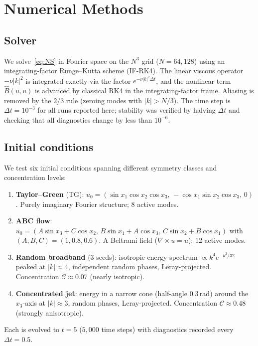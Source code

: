 \documentclass[11pt]{article}
\theoremstyle{definition}
\newcommand{\cC}{\mathcal{C}}
\begin{document}
\section{Numerical Methods}
\label{sec:method}

\subsection{Solver}

We solve~\eqref{eq:NS} in Fourier space on the
$N^3$ grid ($N=64,128$) using an integrating-factor
Runge--Kutta scheme (IF-RK4).  The linear viscous
operator $-\nu|k|^2$ is integrated exactly via the
factor $e^{-\nu|k|^2\Delta t}$, and the nonlinear term
$\hat B(u,u)$ is advanced by classical RK4 in the
integrating-factor frame.  Aliasing is removed by the
$2/3$ rule (zeroing modes with $|k|>N/3$).  The time
step is $\Delta t = 10^{-3}$ for all runs reported here;
stability was verified by halving $\Delta t$ and checking
that all diagnostics change by less than $10^{-6}$.

\subsection{Initial conditions}

We test six initial conditions spanning different symmetry
classes and concentration levels:
\begin{enumerate}[leftmargin=2em]
\item \textbf{Taylor--Green} (TG):
  $u_0 = (\sin x_1\cos x_2\cos x_3,\,
  -\cos x_1\sin x_2\cos x_3,\,0)$.
  Purely imaginary Fourier structure; 8 active modes.
\item \textbf{ABC flow}:
  $u_0 = (A\sin x_3+C\cos x_2,\,B\sin x_1+A\cos x_3,\,
  C\sin x_2+B\cos x_1)$ with $(A,B,C)=(1,0.8,0.6)$.
  A Beltrami field ($\nabla\times u = u$); 12 active modes.
\item \textbf{Random broadband} (3 seeds):
  isotropic energy spectrum $\propto k^4e^{-k^2/32}$
  peaked at $|k|\approx 4$, independent random phases,
  Leray-projected.  Concentration $\cC\approx 0.07$
  (nearly isotropic).
\item \textbf{Concentrated jet}:
  energy in a narrow cone (half-angle $0.3$\,rad) around
  the $x_3$-axis at $|k|\approx 3$, random phases,
  Leray-projected.  Concentration $\cC\approx 0.48$
  (strongly anisotropic).
\end{enumerate}
Each is evolved to $t=5$ ($5{,}000$ time steps) with
diagnostics recorded every $\Delta t=0.5$.
\end{document}
